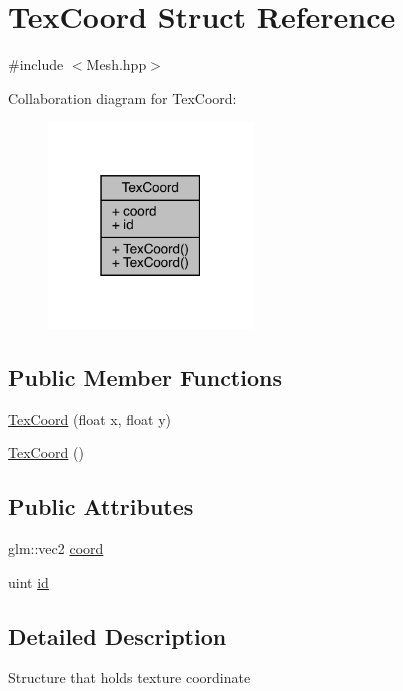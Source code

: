 \hypertarget{struct_tex_coord}{}\section{Tex\+Coord Struct Reference}
\label{struct_tex_coord}


{\ttfamily \#include $<$Mesh.\+hpp$>$}



Collaboration diagram for Tex\+Coord\+:\nopagebreak
\begin{figure}[H]
\begin{center}
\leavevmode
\includegraphics[width=154pt]{struct_tex_coord__coll__graph}
\end{center}
\end{figure}
\subsection*{Public Member Functions}
\begin{DoxyCompactItemize}
\item 
\hyperlink{struct_tex_coord_a02018ed90402d77cb313b581c0ea0561}{Tex\+Coord} (float x, float y)
\item 
\hyperlink{struct_tex_coord_ae1167f68dab931cc523e1f74fa5ad206}{Tex\+Coord} ()
\end{DoxyCompactItemize}
\subsection*{Public Attributes}
\begin{DoxyCompactItemize}
\item 
glm\+::vec2 \hyperlink{struct_tex_coord_a31698d41a1be7a51cbaed632c4fae1e7}{coord}
\item 
uint \hyperlink{struct_tex_coord_aef29d0ef3a3fdcefdda756a2820e2a23}{id}
\end{DoxyCompactItemize}


\subsection{Detailed Description}
Structure that holds texture coordinate 

